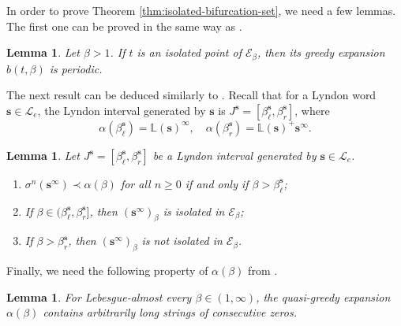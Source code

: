 \documentclass[12pt]{amsart}
\newtheorem{lemma}[theorem]{Lemma}
\theoremstyle{definition}
\theoremstyle{remark}
\numberwithin{equation}{section}
\renewcommand{\L}{\ensuremath{\mathbb{L}}}
\newcommand{\s}{ {\mathbf{s}}}
\newcommand{\E}{\mathscr{E}}
\newcommand{\set}[1]{\left\{#1\right\}}
\newcommand{\f}{\infty}
\newcommand{\al}{\alpha}
\newcommand{\si}{\sigma}
\begin{document}
{In order to prove Theorem \ref{thm:isolated-bifurcation-set}, we need a few lemmas. 
The first one can be proved in the same way as \cite[Proposition 3.3]{Kalle-Kong-Langeveld-Li-18}.




\begin{lemma} \label{lem:isolated-1}
Let $\beta>1$. If $t$ is an isolated point of $\E_\beta$, then its greedy expansion $b(t,\beta)$ is periodic.
\end{lemma}

The next result can be deduced similarly to \cite[Proposition 3.10]{Kalle-Kong-Langeveld-Li-18}. Recall that for a Lyndon word $\s\in\mathcal L_e$, the Lyndon interval generated by $\s$ is $J^{\s}=[\beta_\ell^\s, \beta_r^\s]$, where
\[
\al(\beta_\ell^\s)=\L(\s)^\f,\quad\al(\beta_r^\s)=\L(\s)^+\s^\f.
\]

\begin{lemma} \label{lem:isolated-2}
  Let $J^\s=[\beta_\ell^\s, \beta_r^\s]$ be a Lyndon interval generated by $\s\in\mathcal L_e$.
  \begin{enumerate}[{\rm(i)}]
  \item $\si^n(\s^\f)\prec \al(\beta)$ for all $n\geq 0$ if and only if $\beta>\beta_\ell^\s$;
  \item If $\beta\in(\beta_\ell^\s, \beta_r^\s]$, then $(\s^\f)_\beta$ is isolated in $\E_\beta$;
  \item If $\beta>\beta_r^\s$, then $(\s^\f)_\beta$ is not isolated in $\E_\beta$.
  \end{enumerate}
\end{lemma}

Finally, we need the following property of $\al(\beta)$ from \cite{Schmeling-97}.

\begin{lemma} \label{lem:isolated-3}
For Lebesgue-almost every $\beta\in(1,\f)$, the quasi-greedy expansion $\al(\beta)$ contains arbitrarily long strings of consecutive zeros.
\end{lemma}

}
\end{document}
